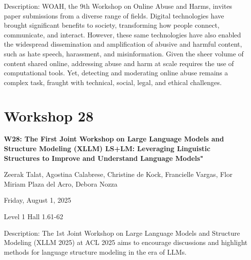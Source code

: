 Description: WOAH, the 9th Workshop on Online Abuse and Harms, invites paper submissions from a diverse range of fields. Digital technologies have brought significant benefits to society, transforming how people connect, communicate, and interact. However, these same technologies have also enabled the widespread dissemination and amplification of abusive and harmful content, such as hate speech, harassment, and misinformation. Given the sheer volume of content shared online, addressing abuse and harm at scale requires the use of computational tools. Yet, detecting and moderating online abuse remains a complex task, fraught with technical, social, legal, and ethical challenges. 

\clearpage


\section[W28: The First Joint Workshop on Large Language Models and Structure Modeling (XLLM)
LS+LM: Leveraging Linguistic Structures to Improve and Understand Language Models"]{Workshop 28}

\begin{center}
    {\Large \textbf{W28: The First Joint Workshop on Large Language Models and Structure Modeling (XLLM)
LS+LM: Leveraging Linguistic Structures to Improve and Understand Language Models"}}

Zeerak Talat, Agostina Calabrese, Christine de Kock, Francielle Vargas, Flor Miriam Plaza del Acro, Debora Nozza

    Friday, August 1, 2025

Level 1 Hall 1.61-62

\end{center}

Description: The 1st Joint Workshop on Large Language Models and Structure Modeling (XLLM 2025) at ACL 2025 aims to encourage discussions and highlight methods for language structure modeling in the era of LLMs.  
